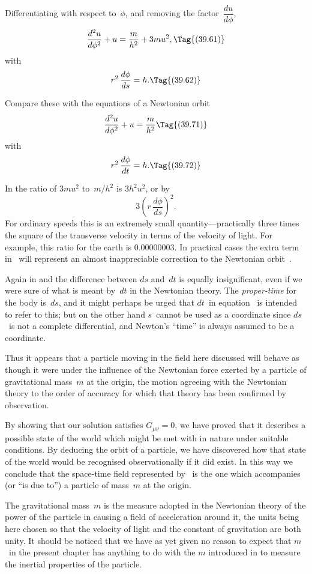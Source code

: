\documentclass[12pt]{book}
\begin{document}
Differentiating with respect to~$\phi$, and removing the factor~$\dfrac{du}{d\phi}$,
\[
\frac{d^{2}u}{d\phi^{2}} + u = \frac{m}{h^{2}} + 3mu^{2},
\Tag{(39.61)}
\]
with
\[
r^{2}\, \frac{d\phi}{ds} = h.
\Tag{(39.62)}
\]

Compare these with the equations of a Newtonian orbit
\[
\frac{d^{2}u}{d\phi^{2}} + u = \frac{m}{h^{2}}
\Tag{(39.71)}
\]
with
\[
r^{2}\, \frac{d\phi}{dt} = h.
\Tag{(39.72)}
\]

In  the ratio of $3mu^{2}$ to~$m/h^{2}$ is $3h^{2}u^{2}$, or by 
\[
3\left(r\, \frac{d\phi}{ds}\right)^{2}.
\]
For ordinary speeds this is an extremely small quantity---practically three
times the square of the transverse velocity in terms of the velocity of light.
For example, this ratio for the earth is $0.00000003$. In practical cases the extra
term in~ will represent an almost inappreciable correction to the Newtonian
orbit~.

Again in  and  the difference between $ds$ and~$dt$ is equally
insignificant, even if we were sure of what is meant by~$dt$ in the Newtonian
theory. The \emph{proper-time} for the body is~$ds$, and it might perhaps be urged
%
that $dt$~in equation~ is intended to refer to this; but on the other hand
$s$~cannot be used as a coordinate since $ds$~is not a complete differential, and
Newton's ``time'' is always assumed to be a coordinate.

Thus it appears that a particle moving in the field here discussed will
behave as though it were under the influence of the Newtonian force exerted
by a particle of gravitational mass~$m$ at the origin, the motion agreeing with
the Newtonian theory to the order of accuracy for which that theory has been
confirmed by observation.

By showing that our solution satisfies $G_{\mu\nu} = 0$, we have proved that it
describes a possible state of the world which might be met with in nature
under suitable conditions. By deducing the orbit of a particle, we have discovered
how that state of the world would be recognised observationally if it
did exist. In this way we conclude that the space-time field represented by~
is the one which accompanies (or ``is due to'') a particle of mass~$m$ at
the origin.

The gravitational mass~$m$ is the measure adopted in the Newtonian theory
of the power of the particle in causing a field of acceleration around it, the
units being here chosen so that the velocity of light and the constant of gravitation
are both unity. It should be noticed that we have as yet given no
reason to expect that $m$~in the present chapter has anything to do with the
$m$ introduced in  to measure the inertial properties of the particle.
\end{document}
